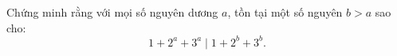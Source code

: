 \ifshowproblem
\begin{problem}\label{example:POL-2015-MO2-P6}
    Chứng minh rằng với mọi số nguyên dương \( a \), tồn tại một số nguyên \( b > a \) sao cho:
    \[
        1 + 2^a + 3^a \mid 1 + 2^b + 3^b.
    \]    
\end{problem}
\fi

\footnotemark
{}
\fi